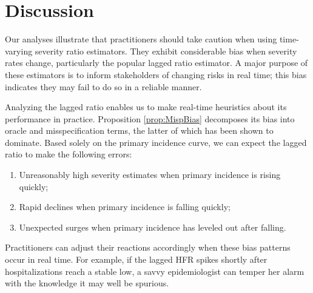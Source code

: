 \documentclass{article}
\renewcommand{\hat}{\widehat} %
\begin{document}

\section{Discussion}

Our analyses illustrate that practitioners should take caution when using
time-varying severity ratio estimators. They exhibit considerable bias when severity rates
change, particularly the popular lagged ratio estimator. A major purpose of these
estimators is to inform stakeholders of changing risks in real time; this bias
indicates they may fail to do so in a reliable manner.

Analyzing the lagged ratio enables us to make real-time heuristics about its performance in practice. Proposition \ref{prop:MispBias} decomposes its bias into oracle and misspecification terms, the latter of which has been shown to dominate. Based solely on the primary incidence curve, we can expect the lagged ratio to make the following errors:
\begin{enumerate}
    \item Unreasonably high severity estimates when primary incidence is rising quickly;
    \item Rapid declines when primary incidence is falling quickly;
    \item Unexpected surges when primary incidence has leveled out after falling. 
\end{enumerate}

Practitioners can adjust their reactions accordingly when these bias patterns occur in real time. For example, if the lagged HFR spikes shortly after hospitalizations reach a stable low, a savvy epidemiologist can temper her alarm with the knowledge it may well be spurious.
\end{document}
